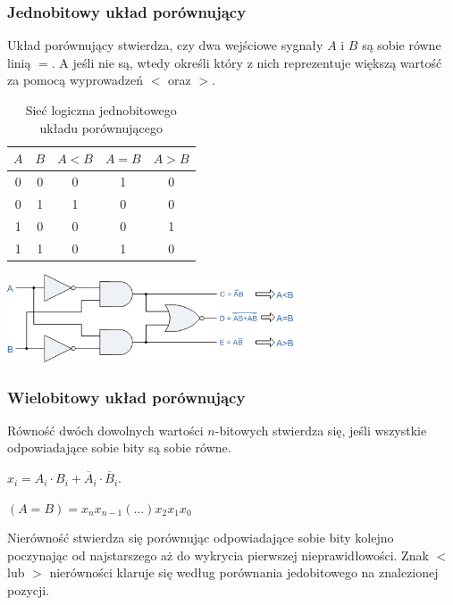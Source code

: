 \documentclass[a4paper,12pt]{article}
\begin{document}
\subsubsection{Jednobitowy układ porównujący}

Układ porównujący stwierdza, czy dwa wejściowe sygnały $A$ i $B$ są sobie równe linią $=$. A jeśli nie są, wtedy określi który z nich reprezentuje większą wartość za pomocą wyprowadzeń $<$ oraz $>$.


\begin{table}[h!]
\centering

\begin{minipage}{6.5cm}
\centering

\begin{tabular}{ | c | c || c | c | c | }
  \hline
  $A$ & $B$ & $A<B$ & $A=B$ & $A>B$ \\ \hline
  0 & 0 & 0 & 1 & 0 \\
  0 & 1 & 1 & 0 & 0 \\
  1 & 0 & 0 & 0 & 1 \\
  1 & 1 & 0 & 1 & 0 \\
  \hline
\end{tabular}
\end{minipage}
\begin{minipage}{10cm}
   \includegraphics[width=8.5cm]{grafika/obwody/cmp.png}
   \caption*{Sieć logiczna jednobitowego układu porównującego}
\end{minipage}
\end{table}


\subsubsection{Wielobitowy układ porównujący}

Równość dwóch dowolnych wartości $n$-bitowych stwierdza się, jeśli wszystkie odpowiadające sobie bity są sobie równe.

$x_i= A_i \cdot B_i + \overline{A}_i \cdot \overline{B}_i.$

$(A=B) = x_nx_{n-1} (...) x_2x_1x_0$

Nierówność stwierdza się porównując odpowiadające sobie bity kolejno poczynając od najstarszego aż do wykrycia pierwszej nieprawidłowości. Znak $<$ lub $>$ nierówności klaruje się według porównania jedobitowego na znalezionej pozycji.
\end{document}
